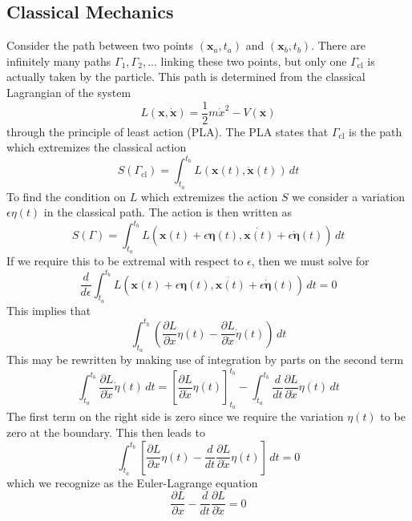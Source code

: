 \subsection{Classical Mechanics}

Consider the path between two points $(\mathbf{x}_a,t_a)$ and $(\mathbf{x}_b,t_b)$.  There are infinitely many paths ${\Gamma_1, \Gamma_2,...}$ linking these two points, but only one $\Gamma_{\mathrm{cl}}$ is actually taken by the particle.  This path is determined from the classical Lagrangian of the system
\begin{equation}
L(\mathbf{x},\dot{\mathbf{x}})=\frac{1}{2}m\dot{x}^2-V(\mathbf{x})
\end{equation}
through the principle of least action (PLA).  The PLA states that $\Gamma_{\mathrm{cl}}$ is the path which extremizes the classical action
\begin{equation}
S(\Gamma_{\mathrm{cl}})=\int^{t_b}_{t_a}L(\mathbf{x}(t),\dot{\mathbf{x}}(t))\,dt
\end{equation}
To find the condition on $L$ which extremizes the action $S$ we consider a variation $\epsilon\eta(t)$ 
in the classical path. The action is then written as
\begin{equation}
S(\Gamma)=\int^{t_b}_{t_a}L(\mathbf{x}(t)+\epsilon\mathbf{\eta}(t),\dot{\mathbf{x}(t)}+\epsilon\dot{\mathbf{\eta}}(t))\,dt
\end{equation}
If we require this to be extremal with respect to $\epsilon$, then we must solve for
\begin{equation}
\frac{d}{d\epsilon}\int^{t_b}_{t_a}L(\mathbf{x}(t)+\epsilon\mathbf{\eta}(t),\dot{\mathbf{x}(t)}+\epsilon\dot{\mathbf{\eta}}(t))\,dt=0
\end{equation}
This implies that
\begin{equation}
\int^{t_b}_{t_a}\left(\frac{\partial L}{\partial x}\eta(t)-\frac{\partial L}{\partial \dot{x}}\dot{\eta}(t)\right)\,dt
\end{equation}
This may be rewritten by making use of integration by parts on the second term 
\begin{equation}
\int^{t_b}_{t_a}\frac{\partial L}{\partial \dot{x}}\dot{\eta}(t)\,dt=\left[\frac{\partial L}{\partial \dot{x}}\eta(t)\right]^{t_b}_{t_a}-\int^{t_b}_{t_a}\frac{d}{dt}\frac{\partial L}{\partial \dot{x}}\eta(t)\,dt
\end{equation} 
The first term on the right side is zero since we require the variation $\eta(t)$ to be zero at the boundary. This then leads to
\begin{equation}
\int^{t_b}_{t_a}\left[\frac{\partial L}{\partial x}\eta(t)-\frac{d}{dt}\frac{\partial L}{\partial \dot{x}}\eta(t)\right]\,dt=0
\end{equation}
which we recognize as the Euler-Lagrange equation
\begin{equation}
\frac{\partial L}{\partial x}-\frac{d}{dt}\frac{\partial L}{\partial \dot{x}}=0
\end{equation}

